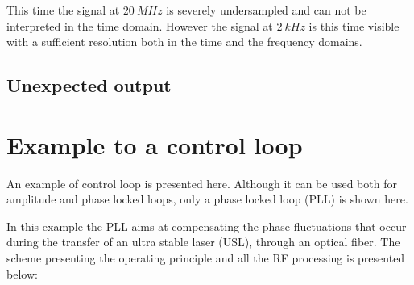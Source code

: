 \documentclass[12pt,oneside]{article}
\begin{document}
This time the signal at $20~MHz$ is severely undersampled and can not be interpreted in the time domain. However the signal at $2~kHz$ is this time visible with a sufficient resolution both in the time and the frequency domains.  

\subsection{Unexpected output}



\section{Example to a control loop}

An example of control loop is presented here. Although it can be used both for amplitude and phase locked loops, only a phase locked loop (PLL) is shown here.  

In this example the PLL aims at compensating the phase fluctuations that occur during the transfer of an ultra stable laser (USL), through an optical fiber. The scheme presenting the operating principle and all the RF processing is presented below:
\end{document}
